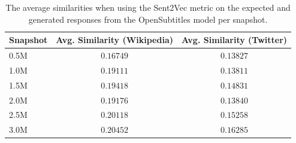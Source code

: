 \begin{table}[H]
	\centering
	\begin{adjustbox}{max width=\textwidth}
		\begin{tabular}{lcc}
			\toprule
			Snapshot & Avg. Similarity (Wikipedia) & Avg. Similarity (Twitter)\\
			\midrule
			0.5M & $0.16749$ & $0.13827$\\
			1.0M & $0.19111$ & $0.13811$\\
			1.5M & $0.19418$ & $0.14831$\\
			2.0M & $0.19176$ & $0.13840$\\
			2.5M & $0.20118$ & $0.15258$\\
			3.0M & $0.20452$ & $0.16285$\\
			\bottomrule
		\end{tabular}
	\end{adjustbox}
	\caption{The average similarities when using the Sent2Vec metric on the expected and generated responses from the OpenSubtitles model per snapshot.}
	\label{results:sent2vec:opensubtitles:results_table}
\end{table}

